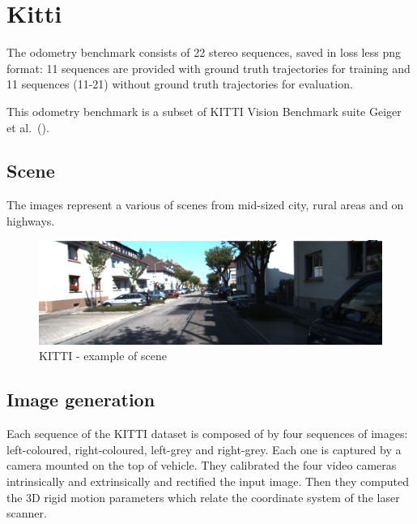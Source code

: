 
\section{Kitti}
\label{sec:kitti}

The odometry benchmark consists of 22 stereo sequences, saved in loss less png format: 11 sequences are provided with ground truth trajectories for training and 11 sequences (11-21) without ground truth trajectories for evaluation.

This odometry benchmark is a subset of KITTI Vision Benchmark suite Geiger et al.~(\cite{kitti_dataset}).

\subsection{Scene}\label{subsec:kitti-scene}
The images represent a various of scenes from mid-sized city, rural areas and on highways.
\begin{figure}[H]
    \centering
    \includegraphics[width=\textwidth]{images/3_1_example_kitti_scene}
    \caption{KITTI - example of scene}\label{fig:example-of-kitti-scene}
\end{figure}

\subsection{Image generation}\label{subsec:kitti-image-generation}
Each sequence of the KITTI dataset is composed of by four sequences of images: left-coloured, right-coloured, left-grey and right-grey.
Each one is captured by a camera mounted on the top of vehicle.
They calibrated the four video cameras intrinsically and extrinsically and rectified the input image.
Then they computed the 3D rigid motion parameters which relate the coordinate system of the laser scanner.

